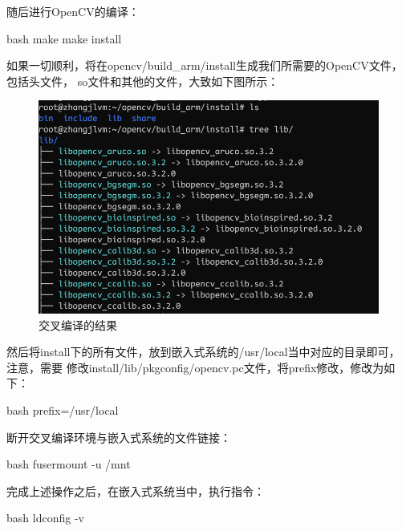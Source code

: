 \begin{outline}[enumerate]
随后进行OpenCV的编译：
\begin{code-in-enumerate}{bash}
make
make install
\end{code-in-enumerate}
如果一切顺利，将在opencv/build\_arm/install生成我们所需要的OpenCV文件，包括头文件，
so文件和其他的文件，大致如下图所示：
\begin{figure}[H]
  \centering
  \includegraphics[width=\linewidth]{cross_finish.png}
  \caption{交叉编译的结果}
  \label{fig:cross_finish}
\end{figure}

然后将install下的所有文件，放到嵌入式系统的/usr/local当中对应的目录即可，注意，需要
修改install/lib/pkgconfig/opencv.pc文件，将prefix修改，修改为如下：
\begin{code-in-enumerate}{bash}
prefix=/usr/local
\end{code-in-enumerate}

断开交叉编译环境与嵌入式系统的文件链接：
\begin{code-in-enumerate}{bash}
fusermount -u /mnt
\end{code-in-enumerate}

完成上述操作之后，在嵌入式系统当中，执行指令：
\begin{code-in-enumerate}{bash}
ldconfig -v
\end{code-in-enumerate}


\end{outline}
